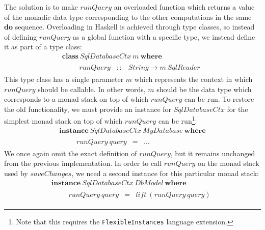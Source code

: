 %
The solution is to make
$\mathit{runQuery}$ an overloaded function which returns a value of the monadic data type corresponding to the other computations in the same \textbf{do} sequence.
Overloading in Haskell is achieved through type classes, so instead of defining $\mathit{runQuery}$ as a global function with a specific type, we instead define it as part of a type class:
\begin{displaymath}
\begin{array}{l}
\mathbf{class}~\mathit{SqlDatabaseCtx}~m~\mathbf{where}\\
\qquad \begin{array}{lcl}
\mathit{runQuery} & :: & \mathit{String} \to m~\mathit{SqlReader}
\end{array}
\end{array}
\end{displaymath}
This type class has a single parameter $m$ which represents the context in which $\mathit{runQuery}$ should be callable. In other words, $m$ should be the data type which corresponds to a monad stack on top of which $\mathit{runQuery}$ can be run. To restore the old functionality, we must provide an instance for $\mathit{SqlDatabaseCtx}$ for the simplest monad stack on top of which $\mathit{runQuery}$ can be run\footnote{Note that this requires the \texttt{FlexibleInstances} language extension.}:
\begin{displaymath}
\begin{array}{l}
\mathbf{instance}~\mathit{SqlDatabaseCtx}~\mathit{MyDatabase}~\mathbf{where}\\
\qquad \begin{array}{lcl}
\mathit{runQuery}~\mathit{query} & = & \ldots
\end{array}
\end{array}
\end{displaymath}
We once again omit the exact definition of $\mathit{runQuery}$, but it remains unchanged from the previous implementation. In order to call $\mathit{runQuery}$ on the monad stack used by $\mathit{saveChanges}$, we need a second instance for this particular monad stack:
\begin{displaymath}
\begin{array}{l}
\mathbf{instance}~\mathit{SqlDatabaseCtx}~\mathit{DbModel}~\mathbf{where}\\
\qquad \begin{array}{lcl}
\mathit{runQuery}~\mathit{query} & = & \mathit{lift}~(\mathit{runQuery}~\mathit{query})
\end{array}
\end{array}
\end{displaymath}
